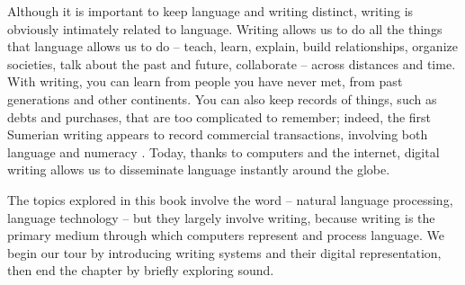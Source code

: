 Although it is important to keep language and writing distinct, writing is obviously intimately related to language.  Writing  allows us to do all the things that language allows us to do -- teach, learn, explain, build relationships, organize societies, talk about the past and future, collaborate -- across distances and time.  With writing, you can learn from people you have never met, from past generations and other continents.  You can also keep records of things, such as debts and purchases, that are too complicated to remember; 
indeed, the first Sumerian writing appears to record commercial transactions, involving both language and numeracy  \citep{Glassner:2003}.  Today, thanks to computers and the internet, digital writing allows us to disseminate language instantly around the globe.

The topics explored in this book involve the word  -- natural language processing, language technology -- but they largely involve writing, because writing is the primary medium through which computers represent and process language.  We begin our tour by introducing writing systems and their digital representation, then end the chapter by briefly exploring sound.








